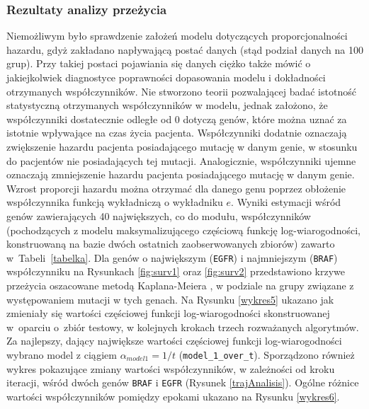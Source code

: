 \subsubsection{Rezultaty analizy przeżycia}
Niemożliwym było sprawdzenie założeń modelu dotyczących proporcjonalności
hazardu, gdyż zakładano napływającą postać danych (stąd podział danych
na 100 grup). Przy takiej postaci pojawiania się danych ciężko także
mówić o jakiejkolwiek diagnostyce poprawności dopasowania modelu i
dokładności otrzymanych współczynników. Nie stworzono teorii
pozwalającej badać istotność statystyczną otrzymanych współczynników w
modelu, jednak założono, że współczynniki dostatecznie odległe od $0$ dotyczą genów, które
można uznać za istotnie wpływające na czas życia pacjenta. Współczynniki
dodatnie oznaczają zwiększenie hazardu pacjenta posiadającego mutację w
danym genie, w stosunku do pacjentów nie posiadających tej mutacji. Analogicznie, współczynniki ujemne oznaczają zmniejszenie hazardu pacjenta
posiadającego mutację w danym genie. Wzrost proporcji hazardu można
otrzymać dla danego genu poprzez obłożenie współczynnika funkcją
wykładniczą o wykładniku $e$. Wyniki estymacji wśród genów zawierających 40 największych, co do modułu, współczynników
(pochodzących z modelu maksymalizującego częściową funkcję log-wiarogodności, konstruowaną na bazie dwóch ostatnich zaobserwowanych zbiorów) zawarto w~Tabeli~\ref{tabelka}. Dla genów o największym (\texttt{EGFR}) i najmniejszym (\texttt{BRAF}) współczynniku na Rysunkach \ref{fig:surv1} oraz \ref{fig:surv2} przedstawiono krzywe przeżycia oszacowane metodą Kaplana-Meiera \citep{kaplanmeier}, w podziale na grupy związane z występowaniem mutacji w tych genach.
Na Rysunku \ref{wykres5} ukazano jak zmieniały się wartości częściowej funkcji log-wiarogodności skonstruowanej w~oparciu o~zbiór testowy, w kolejnych krokach trzech rozważanych algorytmów. Za najlepszy, dający największe wartości częściowej funkcji log-wiarogodności wybrano model z ciągiem $\alpha_{model1} = 1/t$ (\texttt{model\_1\_over\_t}). Sporządzono również wykres pokazujące zmiany wartości współczynników, w zależności od kroku iteracji, wśród dwóch genów \texttt{BRAF} i \texttt{EGFR} (Rysunek \ref{trajAnalisis}). Ogólne różnice wartości współczynników pomiędzy epokami ukazano na Rysunku \ref{wykres6}.
